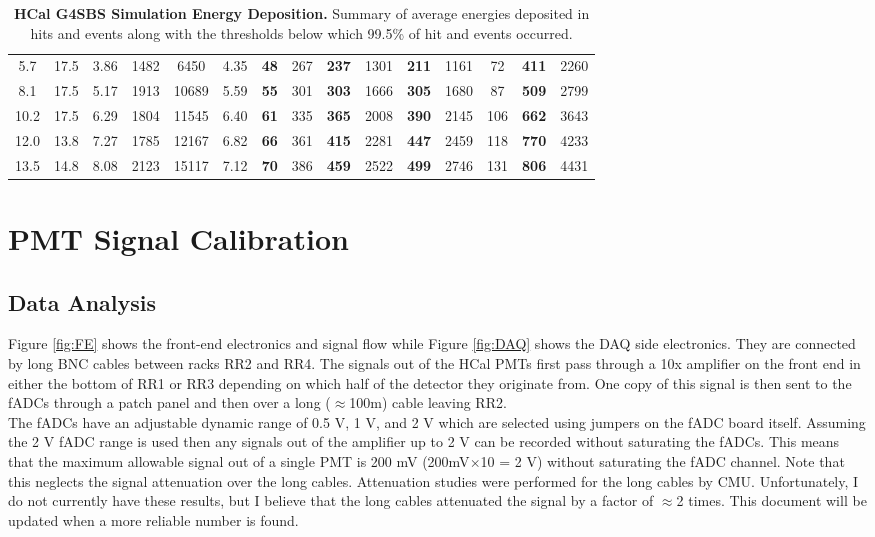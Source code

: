 \documentclass[10pt]{article}
\begin{document}
\begin{landscape}
\begin{table}[!ht]
\begin{tabular}{|c|cccccccccccccc|}
    5.7 & 17.5 & 3.86 & 1482 & 6450 & 4.35 & \bf{48} & 267 & \bf{237} & 1301 & \bf{211} & 1161 & 72 & \bf{411} & 2260 \\
    8.1 & 17.5 & 5.17 & 1913 & 10689 & 5.59 & \bf{55} & 301 & \bf{303} & 1666 & \bf{305} & 1680 & 87 & \bf{509} & 2799 \\
    10.2 & 17.5 & 6.29 & 1804 & 11545 & 6.40 & \bf{61} & 335 & \bf{365} & 2008 & \bf{390} & 2145 & 106 & \bf{662} & 3643 \\
    12.0 & 13.8 & 7.27 & 1785 & 12167 & 6.82 & \bf{66} & 361 & \bf{415} & 2281 & \bf{447} & 2459 & 118 & \bf{770} & 4233 \\
    13.5 & 14.8 & 8.08 & 2123 & 15117 & 7.12 & \bf{70} & 386 & \bf{459} & 2522 & \bf{499} & 2746 & 131 & \bf{806} & 4431 \\
	\hline
	\end{tabular}
	\caption{{\bf{HCal G4SBS Simulation Energy Deposition.}} Summary of average energies deposited in hits and events along with the thresholds below which 99.5\% of hit and events occurred.} %
	\label{tab:edep}
	\end{table}
	
	\end{landscape}
	\restoregeometry
	
\section{PMT Signal Calibration}
\subsection{Data Analysis}
	
	Figure \ref{fig:FE} shows the front-end electronics and signal flow while Figure \ref{fig:DAQ} shows the DAQ side electronics. They are connected by long BNC cables between racks RR2 and RR4. The signals out of the HCal PMTs first pass through a 10x amplifier on the front end in either the bottom of RR1 or RR3 depending on which half of the detector they originate from. One copy of this signal is then sent to the fADCs through a patch panel and then over a long ($\approx$100m) cable leaving RR2.\\
	
	The fADCs have an adjustable dynamic range of 0.5 V, 1 V, and 2 V which are selected using jumpers on the fADC board itself. Assuming the 2 V fADC range is used then any signals out of the amplifier up to 2 V can be recorded without saturating the fADCs. This means that the maximum allowable signal out of a single PMT is 200 mV (200mV$\times$10 = 2 V) without saturating the fADC channel. Note that this neglects the signal attenuation over the long cables. Attenuation studies were performed for the long cables by CMU. Unfortunately, I do not currently have these results, but I believe that the long cables attenuated the signal by a factor of $\approx$2 times. This document will be updated when a more reliable number is found. \\
	
\end{document}
